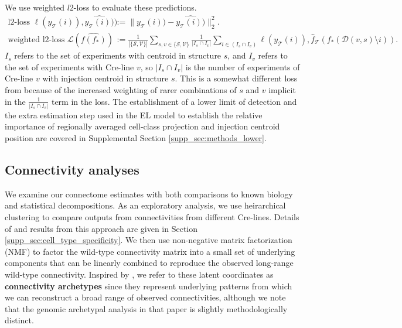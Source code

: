 We use weighted $l2$-loss to evaluate these predictions.
\begin{align*}
\text{l2-loss } \ell (y_{\mathcal T}(i)),\widehat {y_{\mathcal T}(i))}) &:=   \| y_{\mathcal T} (i)) - \widehat {y_{\mathcal T}(i))} \|_2^2. \\
\text{weighted l2-loss } \mathcal L ( \widehat {f(f_*)}) &:= \frac{1}{|\{\mathcal S,\mathcal V\}|} \sum_{s,v \in \{\mathcal S,\mathcal V\}} \frac{1}{ |I_{s} \cap I_v |} \sum_{i \in (I_{s} \cap I_v ) } \ell (y_{\mathcal T}(i)), \hat f_{\mathcal T} (f_*(\mathcal D(v,s) \setminus i)) .
\end{align*}
$I_s$ refers to the set of experiments with centroid in structure $s$, and $I_v$ refers to the set of experiments with Cre-line $v$, so $|I_s \cap I_v|$ is the number of experiments of Cre-line $v$ with injection centroid in structure $s$.
This is a somewhat different loss from \citet{Knox2019-ot} because of the increased weighting of rarer combinations of $s$ and $v$ implicit in the $\frac{1}{ |I_{s} \cap I_v |}$ term in the loss.
The establishment of a lower limit of detection and the extra estimation step used in the EL model to establish the relative importance of regionally averaged cell-class projection and injection centroid position are covered in Supplemental Section \ref{supp_sec:methods_lower}.

\newpage

\subsection{Connectivity analyses}

We examine our connectome estimates with both comparisons to known biology and statistical decompositions.
As an exploratory analysis, we use heirarchical clustering to compare outputs from connectivities from different Cre-lines. 
Details of and results from this approach are given in Section \ref{supp_sec:cell_type_specificity}.
We then use non-negative matrix factorization (NMF) to factor the wild-type connectivity matrix into a small set of underlying components that can be linearly combined to reproduce the observed long-range wild-type connectivity.
Inspired by \citet{Mohammadi2018-te}, we refer to these latent coordinates as \textbf{connectivity archetypes} since they represent underlying patterns from which we can reconstruct a broad range of observed connectivities, although we note that the genomic archetypal analysis in that paper is slightly methodologically distinct.


